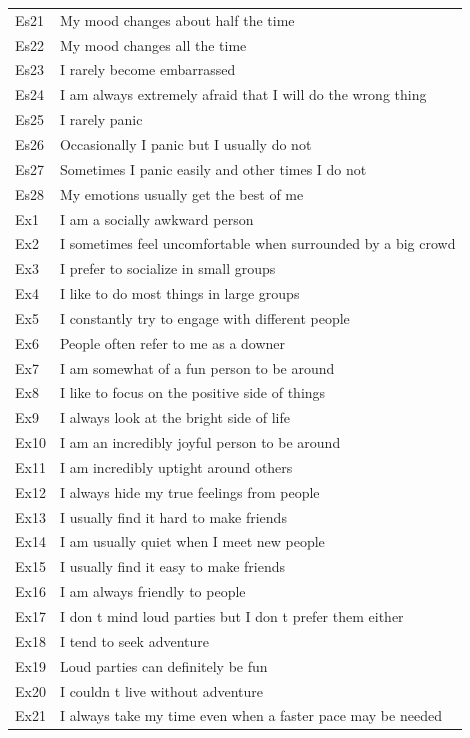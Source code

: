 \documentclass[man]{apa6}
\begin{document}
\begin{longtable}{ll}
Es21 & My mood changes about half the time\\
Es22 & My mood changes all the time\\
Es23 & I rarely become embarrassed\\
\addlinespace
Es24 & I am always extremely afraid that I will do the wrong thing\\
Es25 & I rarely panic\\
Es26 & Occasionally I panic  but I usually do not\\
Es27 & Sometimes I panic easily  and other times I do not\\
Es28 & My emotions usually get the best of me\\
\addlinespace
Ex1 & I am a socially awkward person\\
Ex2 & I sometimes feel uncomfortable when surrounded by a big crowd\\
Ex3 & I prefer to socialize in small groups\\
Ex4 & I like to do most things in large groups\\
Ex5 & I constantly try to engage with different people\\
\addlinespace
Ex6 & People often refer to me as a  downer\\
Ex7 & I am somewhat of a fun person to be around\\
Ex8 & I like to focus on the positive side of things\\
Ex9 & I always look at the bright side of life\\
Ex10 & I am an incredibly joyful person to be around\\
\addlinespace
Ex11 & I am incredibly uptight around others\\
Ex12 & I always hide my true feelings from people\\
Ex13 & I usually find it hard to make friends\\
Ex14 & I am usually quiet when I meet new people\\
Ex15 & I usually find it easy to make friends\\
\addlinespace
Ex16 & I am always friendly to people\\
Ex17 & I don t mind loud parties  but I don t prefer them either\\
Ex18 & I tend to seek adventure\\
Ex19 & Loud parties can definitely be fun\\
Ex20 & I couldn t live without adventure\\
\addlinespace
Ex21 & I always take my time   even when a faster pace may be needed\\

\end{longtable}
\end{document}
